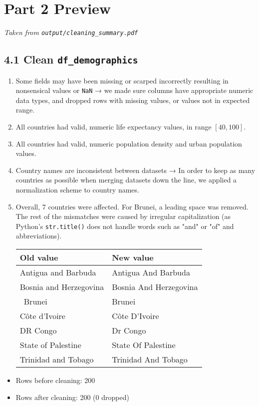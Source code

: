 \documentclass[14pt]{extarticle}
\begin{document}
\section*{Part 2 Preview}
\textit{Taken from \texttt{output/cleaning\_summary.pdf}}
\subsection*{4.1 Clean \texttt{df\_demographics}}
\begin{enumerate}[label=(\alph*)]
  \item Some fields may have been missing or scarped incorrectly resulting in
    nonsensical values or \texttt{NaN} → we made sure columns have appropriate numeric data types,
    and dropped rows with missing values, or values not in expected range.
  \item All countries had valid, numeric life expectancy values, in range $[40,100]$.
  \item All countries had valid, numeric population density and urban population values.
  \item Country names are inconsistent between datasets →
    In order to keep as many countries as possible when merging datasets down the line,
    we applied a normalization scheme to country names.
  \setcounter{enumi}{5}
  \item Overall, 7 countries were affected. For Brunei, a leading space was removed.
    The rest of the mismatches were caused by irregular capitalization
    (as Python's \texttt{str.title()} does not handle words such as "and" or "of" and abbreviations).
  \begin{center}
    \begin{tabular}{ |l|l| }
      \hline
      Old value&New value\\
      \hline
      Antigua and Barbuda&Antigua And Barbuda\\
      Bosnia and Herzegovina&Bosnia And Herzegovina\\
      \ Brunei&Brunei\\
      Côte d'Ivoire&Côte D'Ivoire\\
      DR Congo&Dr Congo\\
      State of Palestine&State Of Palestine\\
      Trinidad and Tobago&Trinidad And Tobago\\
      \hline
    \end{tabular}
  \end{center}
\end{enumerate}
\begin{itemize}
  \item Rows before cleaning: 200
  \item Rows after cleaning: 200 (0 dropped)
\end{itemize}
\end{document}
